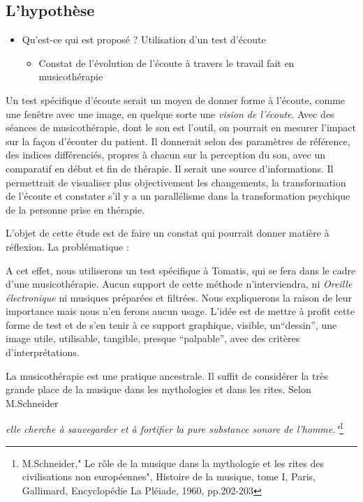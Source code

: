 \subsection{L'hypothèse}

		\begin{itemize}
			\item Qu'est-ce qui est proposé ? 
			Utilisation d'un test d'écoute 
			\begin{itemize}
				\item Constat de l'évolution de l'écoute à travers le travail fait en musicothérapie
			\end{itemize}
		\end{itemize}

Un test spécifique d'écoute serait  un 
moyen de donner  forme à l'écoute, comme une fenêtre avec une  image, en quelque sorte une \emph{vision de l'écoute}. Avec  des séances de musicothérapie, dont  le son est l'outil, on pourrait en mesurer l'impact sur la façon d'écouter du patient. 
Il  donnerait selon des paramètres de référence, des indices différenciés, propres à chacun sur la perception du son, avec un comparatif en début et fin de thérapie. Il serait  une source d'informations. Il permettrait de visualiser plus objectivement
les changements, la transformation de l'écoute et constater s'il y a un parallélisme dans la transformation psychique  de la personne prise en thérapie.


 L'objet de cette étude est de faire un constat
qui pourrait donner matière à réflexion.
La problématique : 

A cet effet, nous utiliserons un test spécifique à Tomatis, qui se fera dans le cadre d'une musicothérapie. Aucun support de cette méthode n'interviendra, ni \textsl{Oreille
électronique} ni musiques préparées et filtrées. Nous expliquerons la raison de   leur importance mais nous n'en ferons aucun usage. L'idée est de mettre à profit cette forme de test et de  s'en tenir à ce support
graphique, visible, un``dessin'', une image utile, utilisable, tangible,
presque ``palpable'', avec des critères
d'interprétations.

La musicothérapie est une pratique ancestrale. Il suffit de considérer la très grande  place de la musique dans les mythologies et dans les rites. Selon M.Schneider
			
\textsl{elle cherche à sauvegarder et à fortifier la pure substance sonore de l'homme."}\footnote{M.Schneider," Le rôle de la musique dans la mythologie et les rites des civilisations non européennes", Histoire de la musique, tome I, Paris, Gallimard, Encyclopédie La Pléiade, 1960, pp.202-203}

